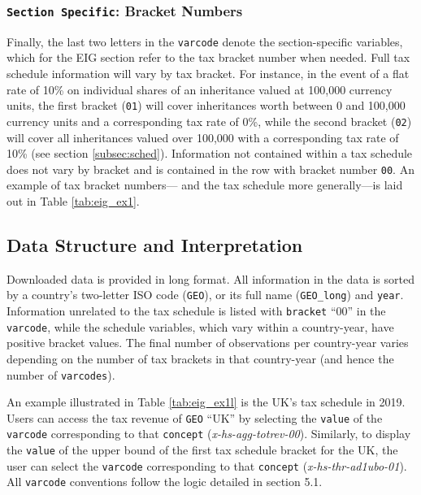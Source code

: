 \documentclass[
]{article}
\begin{document}
\subsubsection{\texorpdfstring{\texttt{Section\ Specific}: Bracket
Numbers}{Section Specific: Bracket Numbers}}\label{subsubsec:brack}

Finally, the last two letters in the \texttt{varcode} denote the
section-specific variables, which for the EIG section refer to the tax
bracket number when needed. Full tax schedule information will vary by
tax bracket. For instance, in the event of a flat rate of 10\% on
individual shares of an inheritance valued at 100,000 currency units,
the first bracket (\texttt{01}) will cover inheritances worth between 0
and 100,000 currency units and a corresponding tax rate of 0\%, while
the second bracket (\texttt{02}) will cover all inheritances valued over
100,000 with a corresponding tax rate of 10\% (see section
\ref{subsec:sched}). Information not contained within a tax schedule
does not vary by bracket and is contained in the row with bracket number
\texttt{00}. An example of tax bracket numbers--- and the tax schedule
more generally---is laid out in Table \ref{tab:eig_ex1}.

\subsection{Data Structure and
Interpretation}\label{data-structure-and-interpretation}

Downloaded data is provided in long format. All information in the data
is sorted by a country's two-letter ISO code (\texttt{GEO}), or its full
name (\texttt{GEO\_long}) and \texttt{year}. Information unrelated to
the tax schedule is listed with \texttt{bracket} ``00'' in the
\texttt{varcode}, while the schedule variables, which vary within a
country-year, have positive bracket values. The final number of
observations per country-year varies depending on the number of tax
brackets in that country-year (and hence the number of
\texttt{varcodes}).

An example illustrated in Table \ref{tab:eig_ex1l} is the UK's tax
schedule in 2019. Users can access the tax revenue of \texttt{GEO}
``UK'' by selecting the \texttt{value} of the \texttt{varcode}
corresponding to that \texttt{concept} (\emph{x-hs-agg-totrev-00}).
Similarly, to display the \texttt{value} of the upper bound of the first
tax schedule bracket for the UK, the user can select the
\texttt{varcode} corresponding to that \texttt{concept}
(\emph{x-hs-thr-ad1ubo-01}). All \texttt{varcode} conventions follow the
logic detailed in section 5.1.
\end{document}
